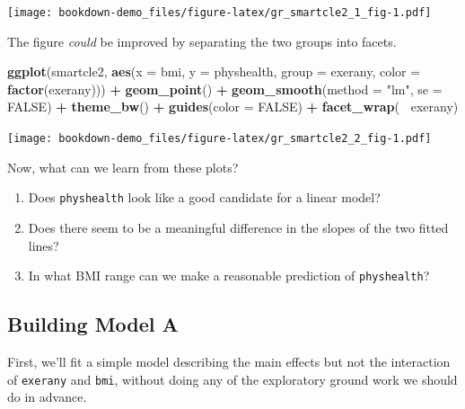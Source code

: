 \documentclass[]{book}
\newenvironment{Shaded}{\begin{snugshade}}{\end{snugshade}}
\newcommand{\KeywordTok}[1]{\textcolor[rgb]{0.13,0.29,0.53}{\textbf{#1}}}
\newcommand{\DataTypeTok}[1]{\textcolor[rgb]{0.13,0.29,0.53}{#1}}
\newcommand{\StringTok}[1]{\textcolor[rgb]{0.31,0.60,0.02}{#1}}
\newcommand{\OtherTok}[1]{\textcolor[rgb]{0.56,0.35,0.01}{#1}}
\newcommand{\OperatorTok}[1]{\textcolor[rgb]{0.81,0.36,0.00}{\textbf{#1}}}
\newcommand{\NormalTok}[1]{#1}
\providecommand{\tightlist}{%
  \setlength{\itemsep}{0pt}\setlength{\parskip}{0pt}}
\theoremstyle{definition}
\theoremstyle{definition}
\theoremstyle{definition}
\theoremstyle{remark}
\begin{document}
\texttt{[image: bookdown-demo\_files/figure-latex/gr\_smartcle2\_1\_fig-1.pdf]}

The figure \emph{could} be improved by separating the two groups into
facets.

\begin{Shaded}
\begin{Highlighting}[]
\KeywordTok{ggplot}\NormalTok{(smartcle2, }\KeywordTok{aes}\NormalTok{(}\DataTypeTok{x =}\NormalTok{ bmi, }\DataTypeTok{y =}\NormalTok{ physhealth, }\DataTypeTok{group =}\NormalTok{ exerany, }\DataTypeTok{color =} \KeywordTok{factor}\NormalTok{(exerany))) }\OperatorTok{+}
\StringTok{    }\KeywordTok{geom_point}\NormalTok{() }\OperatorTok{+}
\StringTok{    }\KeywordTok{geom_smooth}\NormalTok{(}\DataTypeTok{method =} \StringTok{"lm"}\NormalTok{, }\DataTypeTok{se =} \OtherTok{FALSE}\NormalTok{) }\OperatorTok{+}\StringTok{ }
\StringTok{    }\KeywordTok{theme_bw}\NormalTok{() }\OperatorTok{+}\StringTok{ }
\StringTok{    }\KeywordTok{guides}\NormalTok{(}\DataTypeTok{color =} \OtherTok{FALSE}\NormalTok{) }\OperatorTok{+}
\StringTok{    }\KeywordTok{facet_wrap}\NormalTok{(}\OperatorTok{~}\StringTok{ }\NormalTok{exerany)}
\end{Highlighting}
\end{Shaded}

\texttt{[image: bookdown-demo\_files/figure-latex/gr\_smartcle2\_2\_fig-1.pdf]}

Now, what can we learn from these plots?

\begin{enumerate}
\def\labelenumi{\arabic{enumi}.}
\tightlist
\item
  Does \texttt{physhealth} look like a good candidate for a linear
  model?
\item
  Does there seem to be a meaningful difference in the slopes of the two
  fitted lines?
\item
  In what BMI range can we make a reasonable prediction of
  \texttt{physhealth}?
\end{enumerate}

\subsection{Building Model A}\label{building-model-a}

First, we'll fit a simple model describing the main effects but not the
interaction of \texttt{exerany} and \texttt{bmi}, without doing any of
the exploratory ground work we should do in advance.
\end{document}
